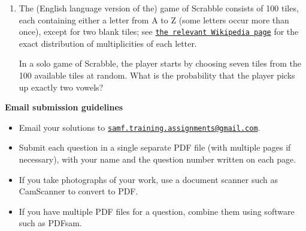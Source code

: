\documentclass[a4paper,12pt, titlepage]{article}
\begin{document}
\begin{enumerate}[1.]
\item %
The (English language version of the) game of Scrabble\texttrademark{} consists of 100 tiles, each containing either a letter from A to Z (some letters occur more than once), except for two blank tiles; see \href{https://en.wikipedia.org/wiki/Scrabble_letter_distributions#English}{\texttt{the relevant Wikipedia page}} for the exact distribution of multiplicities of each letter.

In a solo game of Scrabble, the player starts by choosing seven tiles from the 100 available tiles at random. What is the probability that the player picks up exactly two vowels?



\end{enumerate}

\newpage

\vfill
\textbf{\Large Email submission guidelines}
\begin{itemize}
	\item Email your solutions to \href{mailto:samf.training.assignments@gmail.com}{\texttt{samf.training.assignments@gmail.com}}.
	\item Submit each question in a single separate PDF file (with multiple pages if necessary), with your name and the question number written on each page.
	\item If you take photographs of your work, use a document scanner such as CamScanner to convert to PDF.
	\item If you have multiple PDF files for a question, combine them using software such as PDFsam.
\end{itemize}
\end{document}
